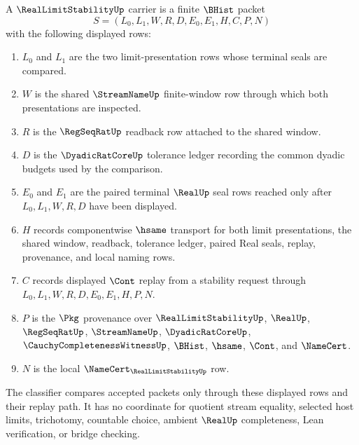 \begin{definition}
\label{def:real-limit-stability-carrier}
A $\RealLimitStabilityUp$ carrier is a finite $\BHist$ packet
$$
S=(L_0,L_1,W,R,D,E_0,E_1,H,C,P,N)
$$
with the following displayed rows:
\begin{enumerate}
\item $L_0$ and $L_1$ are the two limit-presentation rows whose terminal seals are compared.
\item $W$ is the shared $\StreamNameUp$ finite-window row through which both presentations are inspected.
\item $R$ is the $\RegSeqRatUp$ readback row attached to the shared window.
\item $D$ is the $\DyadicRatCoreUp$ tolerance ledger recording the common dyadic budgets used by the comparison.
\item $E_0$ and $E_1$ are the paired terminal $\RealUp$ seal rows reached only after $L_0,L_1,W,R,D$ have been displayed.
\item $H$ records componentwise $\hsame$ transport for both limit presentations, the shared window, readback, tolerance ledger, paired Real seals, replay, provenance, and local naming rows.
\item $C$ records displayed $\Cont$ replay from a stability request through $L_0,L_1,W,R,D,E_0,E_1,H,P,N$.
\item $P$ is the $\Pkg$ provenance over $\RealLimitStabilityUp$, $\RealUp$, $\RegSeqRatUp$, $\StreamNameUp$, $\DyadicRatCoreUp$, $\CauchyCompletenessWitnessUp$, $\BHist$, $\hsame$, $\Cont$, and $\NameCert$.
\item $N$ is the local $\NameCert_{\RealLimitStabilityUp}$ row.
\end{enumerate}
The classifier compares accepted packets only through these displayed rows and their replay path. It has no coordinate for quotient stream equality, selected host limits, trichotomy, countable choice, ambient $\RealUp$ completeness, Lean verification, or bridge checking.
\end{definition}

